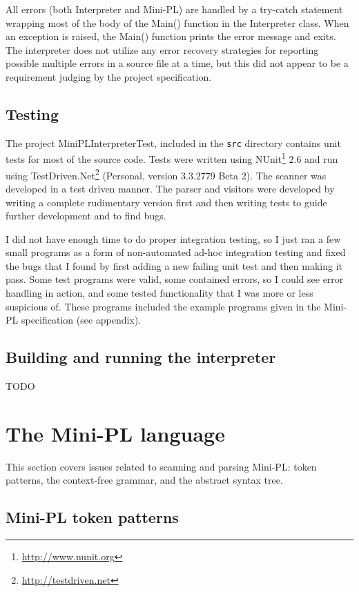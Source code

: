 \documentclass[a4paper,11pt]{article}
\begin{document}
All errors (both Interpreter and Mini-PL) are handled by a try-catch statement wrapping most of the body of the Main() function in the Interpreter class. When an exception is raised, the Main() function prints the error message and exits. The interpreter does not utilize any error recovery strategies for reporting possible multiple errors in a source file at a time, but this did not appear to be a requirement judging by the project specification.

\subsection{Testing}

The project MiniPLInterpreterTest, included in the \verb,src, directory contains unit tests for most of the source code. Tests were written using NUnit\footnote{\url{http://www.nunit.org}} 2.6 and run using TestDriven.Net\footnote{\url{http://testdriven.net}} (Personal, version 3.3.2779 Beta 2). The scanner was developed in a test driven manner. The parser and visitors were developed by writing a complete rudimentary version first and then writing tests to guide further development and to find bugs.

I did not have enough time to do proper integration testing, so I just ran a few small programs as a form of non-automated ad-hoc integration testing and fixed the bugs that I found by first adding a new failing unit test and then making it pass. Some test programs were valid, some contained errors, so I could see error handling in action, and some tested functionality that I was more or less suspicious of. These programs included the example programs given in the Mini-PL specification (see appendix).

\subsection{Building and running the interpreter}

TODO

\section{The Mini-PL language}

This section covers issues related to scanning and parsing Mini-PL: token patterns, the context-free grammar, and the abstract syntax tree.

\subsection{Mini-PL token patterns}
\end{document}
